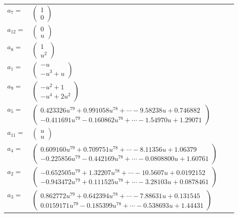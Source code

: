 \documentclass[1p]{elsarticle_modified}
\theoremstyle{definition}
\begin{document}
\begin{tabular}{m{7pt} m{180pt} m{7pt} m{180pt} }
\flushright $a_{7}=$&$\begin{pmatrix}1\\0\end{pmatrix}$ \\
\flushright $a_{12}=$&$\begin{pmatrix}0\\u\end{pmatrix}$ \\
\flushright $a_{8}=$&$\begin{pmatrix}1\\u^2\end{pmatrix}$ \\
\flushright $a_{1}=$&$\begin{pmatrix}- u\\- u^3+u\end{pmatrix}$ \\
\flushright $a_{9}=$&$\begin{pmatrix}- u^2+1\\- u^4+2 u^2\end{pmatrix}$ \\
\flushright $a_{5}=$&$\begin{pmatrix}0.423326 u^{79}+0.991058 u^{78}+\cdots-9.58238 u+0.746882\\-0.411691 u^{79}-0.160862 u^{78}+\cdots-1.54970 u+1.29071\end{pmatrix}$ \\
\flushright $a_{11}=$&$\begin{pmatrix}u\\u\end{pmatrix}$ \\
\flushright $a_{4}=$&$\begin{pmatrix}0.609160 u^{79}+0.709751 u^{78}+\cdots-8.11356 u+1.06379\\-0.225856 u^{79}-0.442169 u^{78}+\cdots-0.0808800 u+1.60761\end{pmatrix}$ \\
\flushright $a_{2}=$&$\begin{pmatrix}-0.652505 u^{79}+1.32207 u^{78}+\cdots-10.5607 u+0.0192152\\-0.943472 u^{79}+0.111525 u^{78}+\cdots-3.28103 u+0.0878461\end{pmatrix}$ \\
\flushright $a_{3}=$&$\begin{pmatrix}0.862772 u^{79}+0.642394 u^{78}+\cdots-7.88631 u+0.131545\\0.0159171 u^{79}-0.185399 u^{78}+\cdots-0.538693 u+1.44431\end{pmatrix}$ \\

\end{tabular}
\end{document}
